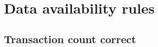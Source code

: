 \documentclass[../midgard.tex]{subfiles}
\begin{document}
\section{Data availability rules}
\label{h:data-availability-rules}

\subsection{Transaction count correct}


\end{document}

